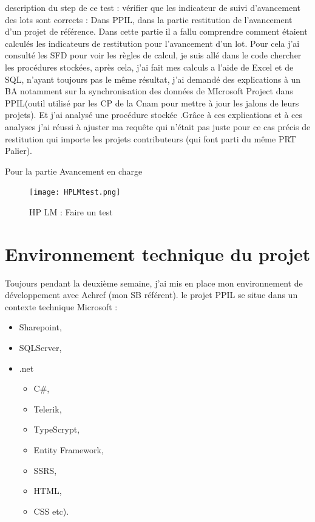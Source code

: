 description du step de ce test : 
vérifier que les indicateur de suivi d'avancement des lots sont corrects :
Dans PPIL, dans la partie restitution de l'avancement d'un projet de référence. Dans cette partie il a fallu comprendre comment étaient calculés les indicateurs de restitution pour l'avancement d'un lot. Pour cela j'ai consulté les SFD pour voir les règles de calcul, je suis allé dans le code chercher les procédures stockées, après cela, j'ai fait mes calculs a l'aide de Excel et de SQL, n'ayant toujours pas le même résultat, j'ai demandé des explications à un BA notamment sur la synchronisation des données de MIcrosoft Project dans PPIL(outil utilisé par les CP de la Cnam pour mettre à jour les jalons de leurs projets). Et j'ai analysé une procédure stockée .Grâce à ces explications et à ces analyses j'ai réussi à ajuster ma requête qui n'était pas juste pour ce cas précis de restitution qui importe les projets contributeurs (qui font parti du même PRT Palier).

Pour la partie Avancement en charge
\begin{figure}[!h]
\centering
\texttt{[image: HPLMtest.png]}\\[1cm]
\caption{HP LM : Faire un test}
\end{figure}

\section{Environnement technique du projet}

Toujours pendant la deuxième semaine, j'ai mis en place mon environnement de développement avec Achref (mon SB référent).
le projet PPIL se situe dans un contexte technique Microsoft :

\begin{itemize}
    \item Sharepoint, 
    \item SQLServer, 
    \item .net
    \begin{itemize}
        \item C\#, 
        \item Telerik, 
        \item TypeScrypt, 
        \item Entity Framework, 
        \item SSRS, 
        \item HTML, 
        \item CSS etc).
    \end{itemize}
\end{itemize}

